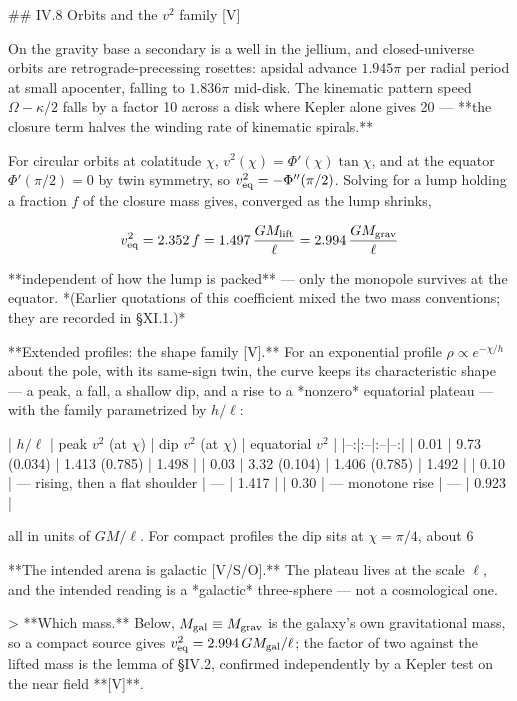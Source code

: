 ## IV.8 Orbits and the $v^2$ family [V]

On the gravity base a secondary is a well in the jellium, and closed-universe orbits are retrograde-precessing rosettes: apsidal advance $1.945\pi$ per radial period at small apocenter, falling to $1.836\pi$ mid-disk. The kinematic pattern speed $\Omega-\kappa/2$ falls by a factor 10 across a disk where Kepler alone gives 20 — **the closure term halves the winding rate of kinematic spirals.**

For circular orbits at colatitude $\chi$, $v^2(\chi) = \Phi'(\chi)\tan\chi$, and at the equator $\Phi'(\pi/2) = 0$ by twin symmetry, so $v^2_{\rm eq} = -\Phi''(\pi/2)$. Solving for a lump holding a fraction $f$ of the closure mass gives, converged as the lump shrinks,

$$v^2_{\rm eq} = 2.352\,f = 1.497\,\frac{GM_{\rm lift} }{\ell} = 2.994\,\frac{GM_{\rm grav} }{\ell}$$

**independent of how the lump is packed** — only the monopole survives at the equator. *(Earlier quotations of this coefficient mixed the two mass conventions; they are recorded in §XI.1.)*

**Extended profiles: the shape family [V].** For an exponential profile $\rho\propto e^{-\chi/h}$ about the pole, with its same-sign twin, the curve keeps its characteristic shape — a peak, a fall, a shallow dip, and a rise to a *nonzero* equatorial plateau — with the family parametrized by $h/\ell$:

| $h/\ell$ | peak $v^2$ (at $\chi$) | dip $v^2$ (at $\chi$) | equatorial $v^2$ |
|--:|:--|:--|--:|
| 0.01 | 9.73 (0.034) | 1.413 (0.785) | 1.498 |
| 0.03 | 3.32 (0.104) | 1.406 (0.785) | 1.492 |
| 0.10 | — rising, then a flat shoulder | — | 1.417 |
| 0.30 | — monotone rise | — | 0.923 |

all in units of $GM/\ell$. For compact profiles the dip sits at $\chi = \pi/4$, about 6%

**The intended arena is galactic [V/S/O].** The plateau lives at the scale $\ell$, and the intended reading is a *galactic* three-sphere — not a cosmological one.

> **Which mass.** Below, $M_{\rm gal}\equiv M_{\rm grav}$ is the galaxy's own gravitational mass, so a compact source gives $v^2_{\rm eq} = 2.994\,GM_{\rm gal}/\ell$; the factor of two against the lifted mass is the lemma of §IV.2, confirmed independently by a Kepler test on the near field **[V]**.


